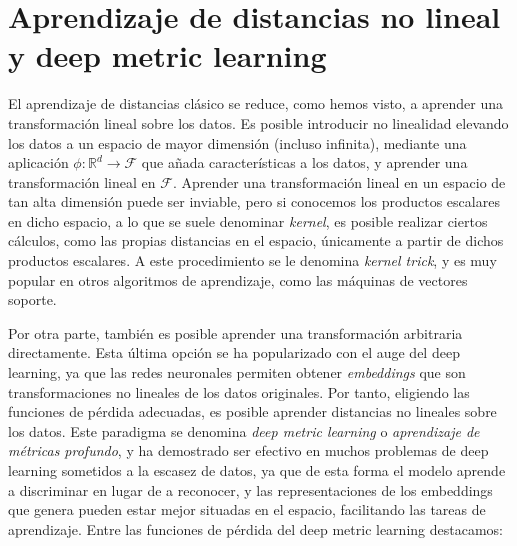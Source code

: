\section{Aprendizaje de distancias no lineal y deep metric learning} \label{sec:contrastive-loss}

El aprendizaje de distancias clásico se reduce, como hemos visto, a aprender una transformación lineal sobre los datos. Es posible introducir no linealidad elevando los datos a un espacio de mayor dimensión (incluso infinita), mediante una aplicación $\phi\colon \mathbb{R}^d \to \mathcal{F}$ que añada características a los datos, y aprender una transformación lineal en $\mathcal{F}$. Aprender una transformación lineal en un espacio de tan alta dimensión puede ser inviable, pero si conocemos los productos escalares en dicho espacio, a lo que se suele denominar \emph{kernel}, es posible realizar ciertos cálculos, como las propias distancias en el espacio, únicamente a partir de dichos productos escalares. A este procedimiento se le denomina \emph{kernel trick}, y es muy popular en otros algoritmos de aprendizaje, como las máquinas de vectores soporte.

Por otra parte, también es posible aprender una transformación arbitraria directamente. Esta última opción se ha popularizado con el auge del deep learning, ya que las redes neuronales permiten obtener \emph{embeddings} que son transformaciones no lineales de los datos originales. Por tanto, eligiendo las funciones de pérdida adecuadas, es posible aprender distancias no lineales sobre los datos. Este paradigma se denomina \emph{deep metric learning} o \emph{aprendizaje de métricas profundo}, y ha demostrado ser efectivo en muchos problemas de deep learning sometidos a la escasez de datos, ya que de esta forma el modelo aprende a discriminar en lugar de a reconocer, y las representaciones de los embeddings que genera pueden estar mejor situadas en el espacio, facilitando las tareas de aprendizaje. Entre las funciones de pérdida del deep metric learning destacamos:

